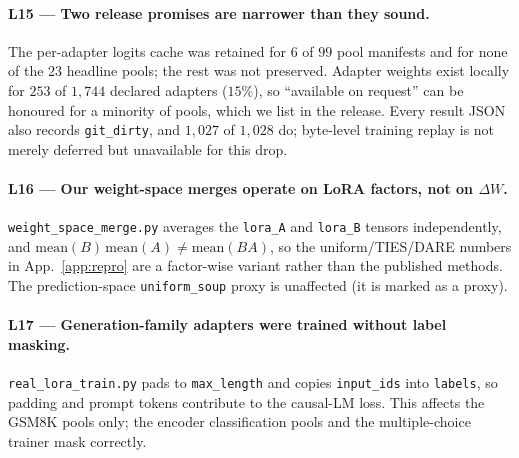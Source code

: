 \documentclass[11pt]{article}
\begin{document}
\paragraph{L15 — Two release promises are narrower than they sound.} The per-adapter logits cache was retained for $6$ of $99$ pool manifests and for none of the $23$ headline pools; the rest was not preserved. Adapter weights exist locally for $253$ of $1{,}744$ declared adapters ($15\%$), so ``available on request'' can be honoured for a minority of pools, which we list in the release. Every result JSON also records \texttt{git\_dirty}, and $1{,}027$ of $1{,}028$ do; byte-level training replay is not merely deferred but unavailable for this drop.

\paragraph{L16 — Our weight-space merges operate on LoRA factors, not on $\Delta W$.} \texttt{weight\_\allowbreak space\_\allowbreak merge.\allowbreak py} averages the \texttt{lora\_A} and \texttt{lora\_B} tensors independently, and $\mathrm{mean}(B)\,\mathrm{mean}(A) \neq \mathrm{mean}(BA)$, so the uniform/TIES/DARE numbers in App.~\ref{app:repro} are a factor-wise variant rather than the published methods. The prediction-space \texttt{uniform\_soup} proxy is unaffected (it is marked as a proxy).

\paragraph{L17 — Generation-family adapters were trained without label masking.} \texttt{real\_\allowbreak lora\_\allowbreak train.\allowbreak py} pads to \texttt{max\_length} and copies \texttt{input\_ids} into \texttt{labels}, so padding and prompt tokens contribute to the causal-LM loss. This affects the GSM8K pools only; the encoder classification pools and the multiple-choice trainer mask correctly.
\end{document}
